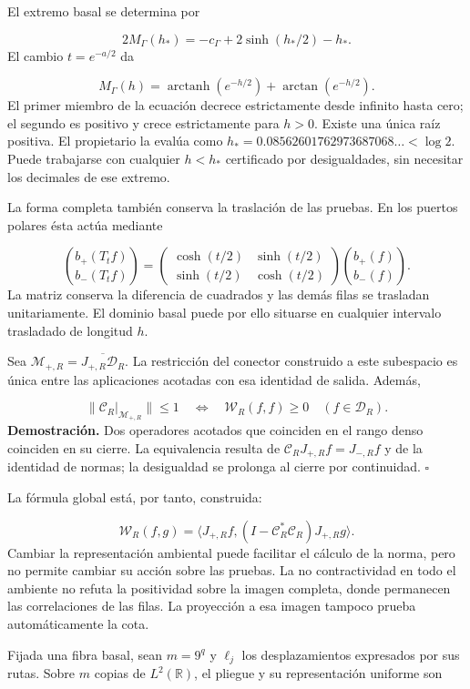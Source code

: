 El extremo basal se determina por

\[
2M_\Gamma(h_*)=-c_\Gamma+2\sinh(h_*/2)-h_*.
\]
El cambio \(t=e^{-a/2}\) da

\[
M_\Gamma(h)=\operatorname{arctanh}(e^{-h/2})
+\arctan(e^{-h/2}).
\]
El primer miembro de la ecuación decrece estrictamente desde infinito hasta cero; el segundo es positivo y crece estrictamente para \(h>0\). Existe una única raíz positiva. El propietario la evalúa como \(h_*=0.08562601762973687068\ldots<\log2\). Puede trabajarse con cualquier \(h<h_*\) certificado por desigualdades, sin necesitar los decimales de ese extremo.

La forma completa también conserva la traslación de las pruebas. En los puertos polares ésta actúa mediante

\[
\binom{b_+(T_tf)}{b_-(T_tf)}=
\begin{pmatrix}\cosh(t/2)&\sinh(t/2)\\
\sinh(t/2)&\cosh(t/2)\end{pmatrix}
\binom{b_+(f)}{b_-(f)}.
\]
La matriz conserva la diferencia de cuadrados y las demás filas se trasladan unitariamente. El dominio basal puede por ello situarse en cualquier intervalo trasladado de longitud \(h\).

Sea \(\mathcal M_{+,R}=\overline{J_{+,R}\mathcal D_R}\). La restricción del conector construido a este subespacio es única entre las aplicaciones acotadas con esa identidad de salida. Además,

\[
\|\mathcal C_R|_{\mathcal M_{+,R}}\|\leq1
\quad\Longleftrightarrow\quad
\mathscr W_R(f,f)\geq0\quad(f\in\mathcal D_R).
\]
\textbf{Demostración.} Dos operadores acotados que coinciden en el rango denso coinciden en su cierre. La equivalencia resulta de \(\mathcal C_RJ_{+,R}f=J_{-,R}f\) y de la identidad de normas; la desigualdad se prolonga al cierre por continuidad. \hfill\(\square\)

La fórmula global está, por tanto, construida:

\[
\mathscr W_R(f,g)=
\langle J_{+,R}f,(I-\mathcal C_R^*\mathcal C_R)J_{+,R}g\rangle.
\]
Cambiar la representación ambiental puede facilitar el cálculo de la norma, pero no permite cambiar su acción sobre las pruebas. La no contractividad en todo el ambiente no refuta la positividad sobre la imagen completa, donde permanecen las correlaciones de las filas. La proyección a esa imagen tampoco prueba automáticamente la cota.

Fijada una fibra basal, sean \(m=9^q\) y \(\ell_j\) los desplazamientos expresados por sus rutas. Sobre \(m\) copias de \(L^2(\mathbb R)\), el pliegue y su representación uniforme son

